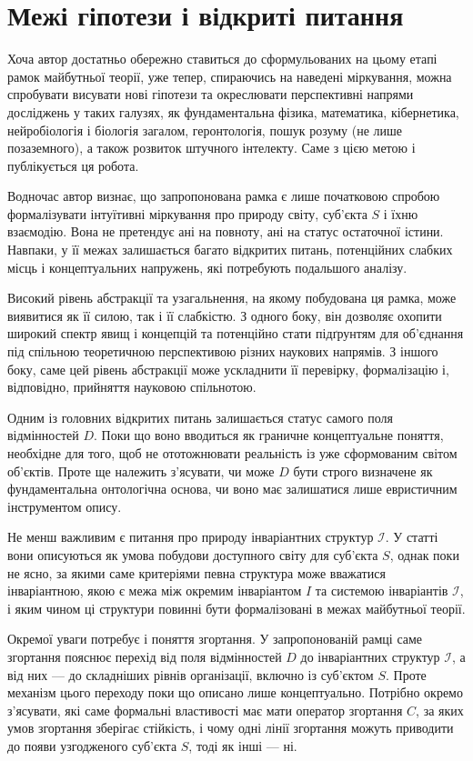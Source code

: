 \documentclass[aps,prd,onecolumn,nofootinbib,superscriptaddress]{revtex4-2}
\begin{document}
\section{Межі гіпотези і відкриті питання}

Хоча автор достатньо обережно ставиться до сформульованих на цьому етапі рамок майбутньої теорії, уже тепер, спираючись на наведені міркування, можна спробувати висувати нові гіпотези та окреслювати перспективні напрями досліджень у таких галузях, як фундаментальна фізика, математика, кібернетика, нейробіологія і біологія загалом, геронтологія, пошук розуму (не лише позаземного), а також розвиток штучного інтелекту. Саме з цією метою і публікується ця робота.

Водночас автор визнає, що запропонована рамка є лише початковою спробою формалізувати інтуїтивні міркування про природу світу, суб’єкта \(S\) і їхню взаємодію. Вона не претендує ані на повноту, ані на статус остаточної істини. Навпаки, у її межах залишається багато відкритих питань, потенційних слабких місць і концептуальних напружень, які потребують подальшого аналізу.

Високий рівень абстракції та узагальнення, на якому побудована ця рамка, може виявитися як її силою, так і її слабкістю. З одного боку, він дозволяє охопити широкий спектр явищ і концепцій та потенційно стати підґрунтям для об’єднання під спільною теоретичною перспективою різних наукових напрямів. З іншого боку, саме цей рівень абстракції може ускладнити її перевірку, формалізацію і, відповідно, прийняття науковою спільнотою.

Одним із головних відкритих питань залишається статус самого поля відмінностей \(D\). Поки що воно вводиться як граничне концептуальне поняття, необхідне для того, щоб не ототожнювати реальність із уже сформованим світом об’єктів. Проте ще належить з’ясувати, чи може \(D\) бути строго визначене як фундаментальна онтологічна основа, чи воно має залишатися лише евристичним інструментом опису.

Не менш важливим є питання про природу інваріантних структур \(\mathcal{I}\). У статті вони описуються як умова побудови доступного світу для суб’єкта \(S\), однак поки не ясно, за якими саме критеріями певна структура може вважатися інваріантною, якою є межа між окремим інваріантом \(I\) та системою інваріантів \(\mathcal{I}\), і яким чином ці структури повинні бути формалізовані в межах майбутньої теорії.

Окремої уваги потребує і поняття згортання. У запропонованій рамці саме згортання пояснює перехід від поля відмінностей \(D\) до інваріантних структур \(\mathcal{I}\), а від них — до складніших рівнів організації, включно із суб’єктом \(S\). Проте механізм цього переходу поки що описано лише концептуально. Потрібно окремо з’ясувати, які саме формальні властивості має мати оператор згортання \(C\), за яких умов згортання зберігає стійкість, і чому одні лінії згортання можуть приводити до появи узгодженого суб’єкта \(S\), тоді як інші — ні.
\end{document}
